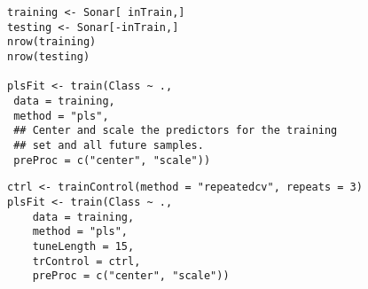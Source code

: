\documentclass[caret-main.tex]{subfiles}
\begin{document}
\begin{framed}
\begin{verbatim}
training <- Sonar[ inTrain,]
testing <- Sonar[-inTrain,]
nrow(training)
nrow(testing)

plsFit <- train(Class ~ .,
 data = training,
 method = "pls",
 ## Center and scale the predictors for the training
 ## set and all future samples.
 preProc = c("center", "scale"))

\end{verbatim}
\end{framed}
\newpage
\begin{framed}
\begin{verbatim}
ctrl <- trainControl(method = "repeatedcv", repeats = 3)
plsFit <- train(Class ~ .,
	data = training,
	method = "pls",
	tuneLength = 15,
	trControl = ctrl,
	preProc = c("center", "scale"))
\end{verbatim}
\end{framed}
\end{document}
